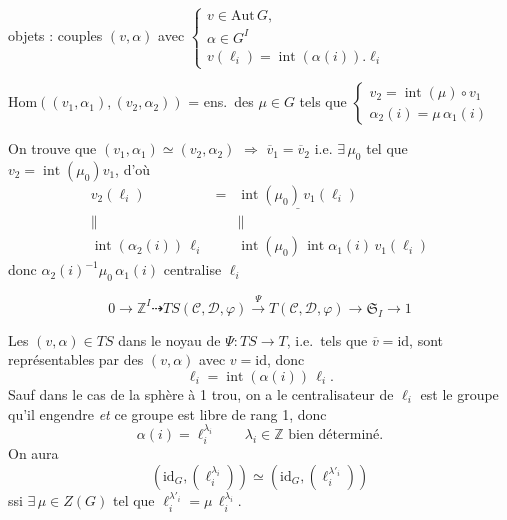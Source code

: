 \documentclass[11pt,a4paper]{article}
\begin{document}
objets : couples $(v, \alpha)$ avec
$\left\{ \begin{array}{l}
  v \in \mathrm{Aut}\, G , \\
  \alpha \in G^I \\
  v(\ell_i) = \operatorname{int}(\alpha(i)) . \ell_i
\end{array} \right.$

$\mathrm{Hom}((v_1, \alpha_1), (v_2, \alpha_2))$ = ens.\ des $\mu \in G$ tels
que
$\left\{ \begin{array}{l}
  v_2 = \operatorname{int}(\mu) \circ v_1 \\
  \alpha_2(i) = \mu\, \alpha_1(i)
\end{array} \right.$

On trouve que $(v_1, \alpha_1) \simeq (v_2, \alpha_2)$ \struck{\ill{}}
$\Rightarrow$ \struck{\ill{}} $\overline{v}_1 = \overline{v}_2$ i.e.
$\exists\, \mu_0$ tel que $v_2 = \operatorname{int}(\mu_0) v_1$, d'où
\[
  \begin{array}{rcl}
    v_2(\ell_i) & = & \underline{\operatorname{int}(\mu_0)\, v_1(\ell_i)} \\
    \| & & \| \\
    \operatorname{int}(\alpha_2(i))\, \ell_i & & \operatorname{int}(\mu_0)\, \operatorname{int} \alpha_1(i)\, v_1(\ell_i)
  \end{array}
\]
donc $\alpha_2(i)^{-1} \mu_0\, \alpha_1(i)$ centralise $\ell_i$


\[
  0 \to \mathbb{Z}^I \dashrightarrow TS(\mathcal{C}, \mathcal{D}, \varphi)
  \xrightarrow{\ \Psi\ } T(\mathcal{C}, \mathcal{D}, \varphi) \to
  \mathfrak{S}_I \to 1
\]

Les $(v, \alpha) \in TS$ dans le noyau de $\Psi : TS \to T$, i.e.\ tels que
$\overline{v} = \mathrm{id}$, sont représentables par des $(v, \alpha)$ avec
$v = \mathrm{id}$, donc
\[
  \ell_i = \operatorname{int}(\alpha(i))\, \ell_i .
\]
Sauf dans le cas de la sphère à 1 trou, on a le centralisateur de $\ell_i$
est le groupe qu'il engendre \emph{et} ce groupe est libre de rang 1, donc
\struck{\ill{}}
\[
  \alpha(i) = \ell_i^{\lambda_i} \qquad \lambda_i \in \mathbb{Z} \text{ bien déterminé.}
\]
On aura
\[
  (\mathrm{id}_G, (\ell_i^{\lambda_i})) \simeq (\mathrm{id}_G, (\ell_i^{\lambda'_i}))
\]
ssi $\exists\, \mu \in Z(G)$ tel que
$\ell_i^{\lambda'_i} = \mu\, \ell_i^{\lambda_i}$.
\end{document}
